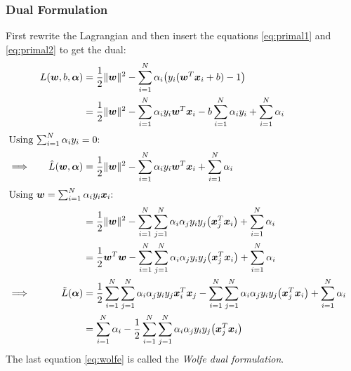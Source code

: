 			\subsubsection{Dual Formulation} %
				First rewrite the Lagrangian and then insert the equations \ref{eq:primal1} and \ref{eq:primal2} to get the dual:
				\begin{align}
					         &  & L(\vec{w}, b, \vec{\alpha})    & = \frac{1}{2} \lVert \vec{w} \rVert^2 - \sum_{i = 1}^{N} \alpha_i \big( y_i (\vec{w}^T \vec{x}_i + b) - 1 \big)                                                                                                           &                  \\
					         &  &                                & = \frac{1}{2} \lVert \vec{w} \rVert^2 - \sum_{i = 1}^{N} \alpha_i y_i \vec{w}^T \vec{x}_i - b \sum_{i = 1}^{N} \alpha_i y_i + \sum_{i = 1}^{N} \alpha_i                                                                   &                  \\
					\intertext{Using \( \sum_{i = 1}^{N} \alpha_i y_i = 0 \):}
					\implies &  & \hat{L}(\vec{w}, \vec{\alpha}) & = \frac{1}{2} \lVert \vec{w} \rVert^2 - \sum_{i = 1}^{N} \alpha_i y_i \vec{w}^T \vec{x}_i + \sum_{i = 1}^{N} \alpha_i                                                                                                     &                  \\
					\intertext{Using \( \vec{w} = \sum_{i = 1}^{N} \alpha_i y_i \vec{x}_i \):}
					         &  &                                & = \frac{1}{2} \lVert \vec{w} \rVert^2 - \sum_{i = 1}^{N} \sum_{j = 1}^{N} \alpha_i \alpha_j y_i y_j \big(\vec{x}_j^T \vec{x}_i\big) + \sum_{i = 1}^{N} \alpha_i                                                           &                  \\
					         &  &                                & = \frac{1}{2} \vec{w}^T \vec{w} - \sum_{i = 1}^{N} \sum_{j = 1}^{N} \alpha_i \alpha_j y_i y_j \big(\vec{x}_j^T \vec{x}_i\big) + \sum_{i = 1}^{N} \alpha_i                                                                 &                  \\
					\implies &  & \tilde{L}(\vec{\alpha})        & = \frac{1}{2} \sum_{i = 1}^{N} \sum_{j = 1}^{N} \alpha_i \alpha_j y_i y_j \vec{x}_i^T \vec{x}_j - \sum_{i = 1}^{N} \sum_{j = 1}^{N} \alpha_i \alpha_j y_i y_j \big(\vec{x}_j^T \vec{x}_i\big) + \sum_{i = 1}^{N} \alpha_i &                  \\
					         &  &                                & = \sum_{i = 1}^{N} \alpha_i - \frac{1}{2} \sum_{i = 1}^{N} \sum_{j = 1}^{N} \alpha_i \alpha_j y_i y_j \big(\vec{x}_j^T \vec{x}_i\big)                                                                                     & \label{eq:wolfe}
				\end{align}
				The last equation \ref{eq:wolfe} is called the \emph{Wolfe dual formulation}.

